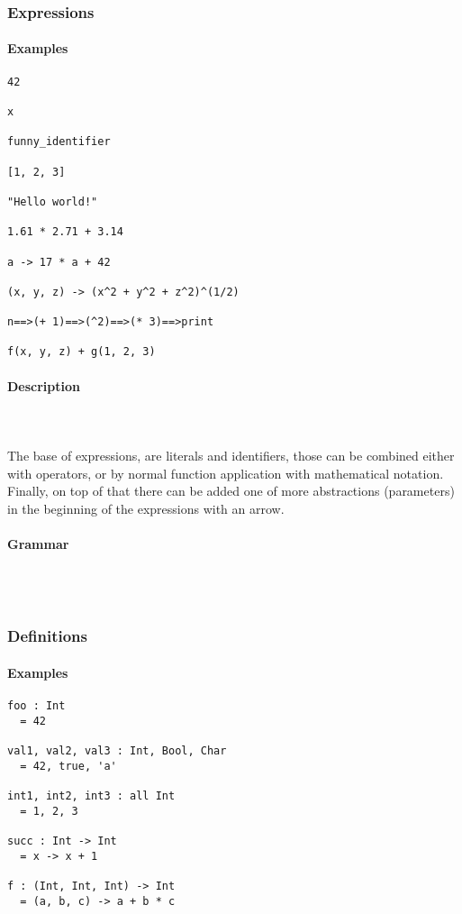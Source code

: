 \documentclass{article}
\def\pend{\mbox{} \\\\}
\begin{document}
\subsubsection{Expressions}

\paragraph{Examples}

\begin{verbatim}
42

x

funny_identifier 

[1, 2, 3]

"Hello world!"

1.61 * 2.71 + 3.14

a -> 17 * a + 42

(x, y, z) -> (x^2 + y^2 + z^2)^(1/2)

n==>(+ 1)==>(^2)==>(* 3)==>print

f(x, y, z) + g(1, 2, 3)
\end{verbatim}

\paragraph{Description}\pend
The base of expressions, are literals and identifiers, those can be combined either
with operators, or by normal function application with mathematical notation. 
Finally, on top of that there can be added one of more abstractions (parameters)
in the beginning of the expressions with an arrow.

\paragraph{Grammar}\pend

\subsubsection{Definitions}

\paragraph{Examples}

\begin{verbatim}
foo : Int
  = 42

val1, val2, val3 : Int, Bool, Char
  = 42, true, 'a'

int1, int2, int3 : all Int
  = 1, 2, 3

succ : Int -> Int
  = x -> x + 1

f : (Int, Int, Int) -> Int
  = (a, b, c) -> a + b * c
\end{verbatim}
\end{document}
